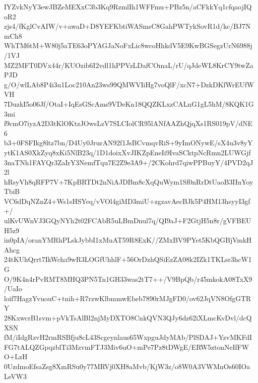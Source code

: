 IYZvkNyY3ewJBZeMEXxC3b3Kq9RzmlIh1WFFmu+PBz5n/aCFkkYq1cfqaojIQoR2
zjs4/fKglCvAIW/v+awaD+D8YEFKbtiWASmsC8GahPWTykSovR1d/kc/BJ7NmCh8
WhTM6tM+W80j5aTE63oPYAGJaNoFxLic8wcoHhkdV5E9KwBGSegzUrN6988j/1VJ
MZ2MFT0DVx44r/KUOzib6I2vdl1hPPVzLDafCOmaL/rU/qJdeWL8KrCY9twZaPJD
g/O/wlLAb8P4i3u1Loc210An23ws99QMWVIiHg7voQlF/xcN7+DzkDKfWrEUfWVH
7DuzkI5o06Jf/OtaI+IqEsGScAms9VDeKn18QQZKLxzCALnG1gL5hM/8KQK1G3mi
f9cmO7iyzA2D3tKlOKtzJOwsLzV7SLCIolCR95lANfAAZhQjqXs1RS019pV/dNE6
b3+0FSFIkg8ltz7bn/D4Uy0JrurAN92f1JsBCvmqvRiS+9yImONywE/sX4u3v8yY
ytK1AS0XkZyq8xKi5NlB23q/1D1doixXvJIKZpEneIi9IvaSCktpNcRmn2LUWGjf
3naTNh1FAYQr3ZaIrY3NemfTqu7E2Z9e3A9+/2CKohrd7qiwPPBuyY/4PVD2qJ2l
hRsyVh8qRFP7V+7KpBRTDt2nNiAJDBm8cXqQuWym1Sf0nRrDtUaoB3IInYoyTbiB
VC6dDqNZnZ4+Ws1sHSYeq/vVOl4giMD3miU+zgzavAecBJk5P4HM13hsyyI3gf+/
ulKvUWnVJ3GQyNYh2t02FCAbR5uLBmDnul7q/QI9aJ+F2GtjH5n8r/gVFBEUH5z9
in0pIA/oranYMRhPLskJybbI1xMuAT59R8ExK//ZMxBV9PYet5KbQGBjVmkHAhcg
24tKUhQrrt7IkWcha9wR3LOGfUhhlF+56OrDzhQSiEzZA08k2IZk1TKLsr3hcW1G
O/9K4n4rPvRMT8MHQ3PN5Tn1GH33was2tT7++/V9BpQb/r45mkokA08TxX9/UaIo
loif7HagzYvuouC+tnih+R7rzwKlbmmwEbeb7890rMJgFD0/ov62JqVN8OfgGTRY
28KxwcrB1svm+pVkTsAlBl2njMyDXTO8CnkQVN3QJy6dz62iXLmcKvDvl/dcQXSN
fM/iIdgRzvH2rmRSBfju8cL43Scgeynlaus65WxpguJdyMAb/PlSDAJ+YzvMKFdI
FG7tALQZGpqzblTi3MzvmFTJ3Miv6uO+mPe7Pz8tDWgE/ERW5ztonNeIfFWO+LzH
0UzdmoEfsaZsg8XmRSu0y77MRVj0XH8aMvb/KjW3z/o8W0A3VWMnOs60IOaLeVW3
